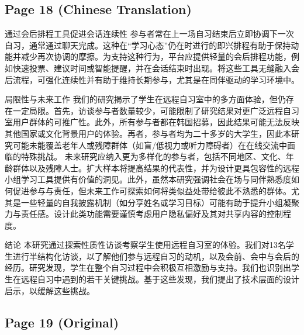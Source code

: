 \documentclass[12pt]{ctexart}
\begin{document}
\subsection*{Page 18 (Chinese Translation)}

通过会后排程工具促进会话连续性
参与者常在上一场自习结束后立即协调下一次自习，通常通过聊天完成。这种在“学习心态”仍在时进行的即兴排程有助于保持动能并减少再次协调的摩擦。为支持这种行为，平台应提供轻量的会后排程功能，例如快速投票、建议时间或智能提醒，并在会话结束时出现。将这些工具无缝融入会后流程，可强化连续性并有助于维持长期参与，尤其是在同伴驱动的学习环境中。

局限性与未来工作
我们的研究揭示了学生在远程自习室中的多方面体验，但仍存在一定局限。首先，访谈参与者数量较少，可能限制了研究结果对更广泛远程自习室用户群体的可推广性。此外，所有参与者都在韩国招募，因此结果可能无法反映其他国家或文化背景用户的体验。再者，参与者均为二十多岁的大学生，因此本研究可能未能覆盖老年人或残障群体（如盲/低视力或听力障碍者）在在线交流中面临的特殊挑战。
未来研究应纳入更为多样化的参与者，包括不同地区、文化、年龄群体以及残障人士。扩大样本将提高结果的代表性，并为设计更具包容性的远程小组学习工具提供有价值的洞见。此外，虽然本研究强调社会在场与同伴熟悉度如何促进参与与责任，但未来工作可探索如何将类似益处带给彼此不熟悉的群体。尤其是一些轻量的自我披露机制（如分享姓名或学习目标）可能有助于提升小组凝聚力与责任感。设计此类功能需要谨慎考虑用户隐私偏好及其对共享内容的控制程度。

结论
本研究通过探索性质性访谈考察学生使用远程自习室的体验。我们对13名学生进行半结构化访谈，以了解他们参与远程自习的动机，以及会前、会中与会后的经历。研究发现，学生在整个自习过程中会积极互相激励与支持。我们也识别出学生在远程自习中遇到的若干关键挑战。基于这些发现，我们提出了技术层面的设计启示，以缓解这些挑战。

\subsection*{Page 19 (Original)}
\end{document}

